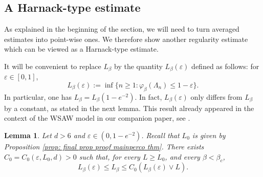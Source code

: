 \documentclass[11pt,a4paper]{article}
\numberwithin{equation}{section}
\theoremstyle{plain}
\newtheorem{Lem}[Thm]{Lemma}
\theoremstyle{definition}
\begin{document}
\subsection{A Harnack-type estimate}\label{sec: harnack perco}

As explained in the beginning of the section, we will need to turn averaged estimates into point-wise ones. We therefore show another regularity estimate which can be viewed as a Harnack-type estimate.

It will be convenient to replace $L_\beta$ by the quantity $L_\beta(\varepsilon)$ defined as follows: for $\varepsilon\in [0,1]$, \begin{equation}
L_\beta(\varepsilon):=\inf\{n\ge1:\varphi_\beta(\Lambda_n)\le 1-\varepsilon\}.
\end{equation}
In particular, one has $L_\beta=L_\beta(1-e^{-2})$. In fact, $L_\beta(\varepsilon)$ only differs from $L_\beta$ by a constant, as stated in the next lemma. This result already appeared in the context of the WSAW model in our companion paper, see \cite[Lemma~3.1]{DumPan24WSAW}.
\begin{Lem}\label{lem: l_beta differs by constant} Let $d>6$ and $\varepsilon\in (0,1-e^{-2})$. Recall that $L_0$ is given by Proposition \textup{\ref{prop: final prop proof mainperco thm}}. There exists $C_0=C_0(\varepsilon,L_0,d)>0$ such that, for every $L\geq L_0$, and every $\beta<\beta_c$,
\begin{equation}\label{eq: comparison diff l beta}
	L_\beta(\varepsilon)\leq L_\beta\leq C_0(L_\beta(\varepsilon)\vee L).
\end{equation}
\end{Lem}
\end{document}
